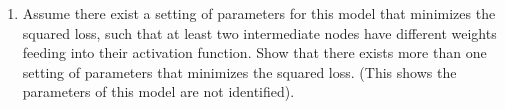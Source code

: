 \documentclass[11pt]{article}
\begin{document}
\begin{enumerate}
\begin{answertext}{22cm}{}
As we have $\beta_j \geq 0$ and $\frac{\partial^2h_j(g(w_1, \ldots, w_k))}{\partial^2 w_i} \geq 0$ as we have proved above, we have $\frac {\partial^2 H}{\partial^2 w_i} \geq 0$ for all $w_i$. Thus, H is convex to all $w_i$ \\
Secondly take the second derivative with respect to $\beta_j$:
\begin{align*}
\frac {\partial^2 H}{\partial^2 \beta_j} =& \frac {\partial }{\partial \beta_j}\frac{\partial^2h_j(g(w_1, \ldots, w_k))}{\partial^2 w_i} \\
=& 0
\end{align*}
As  $\frac {\partial^2 H}{\partial^2 \beta_j} \geq 0$, H is also convex to all $\beta_j$. Thus, we have shown that the likelihood (H) is convex to all weight parameters ($w_i$ and $\beta_j$).
\end{answertext} 
\pagebreak

\item Assume there exist a setting of parameters for this model that minimizes the squared loss, such that at least two intermediate nodes have different weights feeding into their activation function.
Show that there exists more than one setting of parameters that minimizes the squared loss.  (This shows the parameters of this model are not identified).


\end{enumerate}
\end{document}
